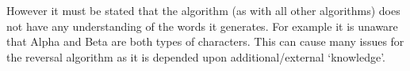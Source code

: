 However it must be stated that the algorithm (as with all other algorithms) does
not have any understanding of the words it generates. For example it is unaware
that Alpha and Beta are both types of characters. This can cause many issues for
the reversal algorithm as it is depended upon additional/external `knowledge'.
